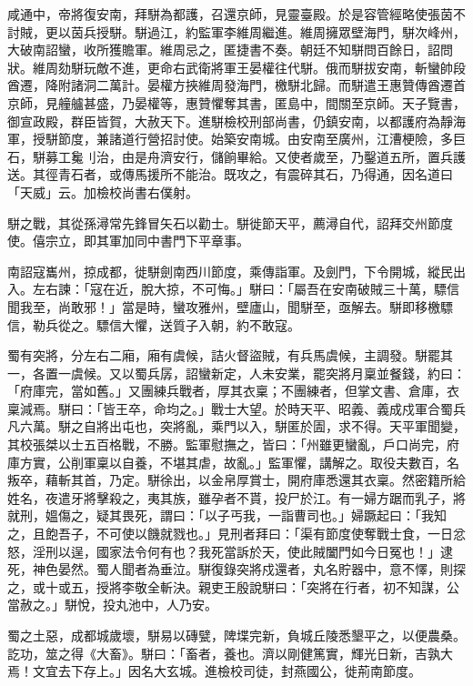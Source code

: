 \begin{pinyinscope}
 咸通中，帝將復安南，拜駢為都護，召還京師，見靈臺殿。於是容管經略使張茵不討賊，更以茵兵授駢。駢過江，約監軍李維周繼進。維周擁眾壁海門，駢次峰州，大破南詔蠻，收所獲贍軍。維周忌之，匿捷書不奏。朝廷不知駢問百餘日，詔問狀。維周劾駢玩敵不進，更命右武衛將軍王晏權往代駢。俄而駢拔安南，斬蠻帥段酋遷，降附諸洞二萬計。晏權方挾維周發海門，檄駢北歸。而駢遣王惠贊傳酋遷首京師，見艟艫甚盛，乃晏權等，惠贊懼奪其書，匿島中，間關至京師。天子覽書，御宣政殿，群臣皆賀，大赦天下。進駢檢校刑部尚書，仍鎮安南，以都護府為靜海軍，授駢節度，兼諸道行營招討使。始築安南城。由安南至廣州，江漕梗險，多巨石，駢募工毚刂治，由是舟濟安行，儲餉畢給。又使者歲至，乃鑿道五所，置兵護送。其徑青石者，或傳馬援所不能治。既攻之，有震碎其石，乃得通，因名道曰「天威」云。加檢校尚書右僕射。



 駢之戰，其從孫潯常先鋒冒矢石以勸士。駢徙節天平，薦潯自代，詔拜交州節度使。僖宗立，即其軍加同中書門下平章事。



 南詔寇巂州，掠成都，徙駢劍南西川節度，乘傳詣軍。及劍門，下令開城，縱民出入。左右諫：「寇在近，脫大掠，不可悔。」駢曰：「屬吾在安南破賊三十萬，驃信聞我至，尚敢邪！」當是時，蠻攻雅州，壁廬山，聞駢至，亟解去。駢即移檄驃信，勒兵從之。驃信大懼，送質子入朝，約不敢寇。



 蜀有突將，分左右二廂，廂有虞候，詰火督盜賊，有兵馬虞候，主調發。駢罷其一，各置一虞候。又以蜀兵孱，詔蠻新定，人未安業，罷突將月稟並餐錢，約曰：「府庫完，當如舊。」又團練兵戰者，厚其衣稟；不團練者，但掌文書、倉庫，衣稟減焉。駢曰：「皆王卒，命均之。」戰士大望。於時天平、昭義、義成戍軍合蜀兵凡六萬。駢之自將出屯也，突將亂，乘門以入，駢匿於圊，求不得。天平軍聞變，其校張桀以士五百格戰，不勝。監軍慰撫之，皆曰：「州雖更蠻亂，戶口尚完，府庫方實，公削軍稟以自養，不堪其虐，故亂。」監軍懼，講解之。取役夫數百，名叛卒，藉斬其首，乃定。駢徐出，以金帛厚賞士，開府庫悉還其衣稟。然密籍所給姓名，夜遣牙將擊殺之，夷其族，雖孕者不貰，投尸於江。有一婦方踞而乳子，將就刑，媼傷之，疑其畏死，謂曰：「以子丐我，一詣曹司也。」婦蹶起曰：「我知之，且飽吾子，不可使以饑就戮也。」見刑者拜曰：「渠有節度使奪戰士食，一日忿怒，淫刑以逞，國家法令何有也？我死當訴於天，使此賊闔門如今日冤也！」逮死，神色晏然。蜀人聞者為垂泣。駢復錄突將戍還者，丸名貯器中，意不懌，則探之，或十或五，授將李敬全斬決。親吏王殷說駢曰：「突將在行者，初不知謀，公當赦之。」駢悅，投丸池中，人乃安。



 蜀之土惡，成都城歲壞，駢易以磚甓，陴堞完新，負城丘陵悉墾平之，以便農桑。訖功，筮之得《大畜》。駢曰：「畜者，養也。濟以剛健篤實，輝光日新，吉孰大焉！文宜去下存上。」因名大玄城。進檢校司徒，封燕國公，徙荊南節度。




\end{pinyinscope}

